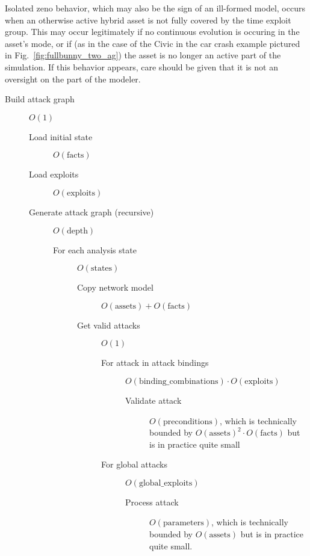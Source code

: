 Isolated zeno behavior, which may also be the sign of an ill-formed model, 
occurs when an otherwise active hybrid asset is not fully covered by the time
exploit group. This may occur legitimately if no continuous evolution is
occuring in the asset's mode, or if (as in the case of the Civic in the
car crash example pictured in Fig.~\ref{fig:fullbunny_two_ag}) the asset is
no longer an active part of the simulation. If this behavior appears, care 
should be given that it is not an oversight on the part of the modeler.
\begin{description}
    \item[Build attack graph] $O(1)$
    \begin{description}
        \item[Load initial state] $O(\text{facts})$
        \item[Load exploits] $O(\text{exploits})$
        \item[Generate attack graph (recursive)] $O(\text{depth})$
        \begin{description}
            \item[For each analysis state] $O(\text{states})$
            \begin{description}
                \item[Copy network model] $O(\text{assets}) + O(\text{facts})$
                \item[Get valid attacks] $O(1)$
                \begin{description}
                    \item[For attack in attack bindings] $O(\text{binding\_combinations}) \cdot O(\text{exploits})$
                    \begin{description}
                        \item[Validate attack] $O(\text{preconditions})$, which is
                            technically bounded by $O(\text{assets})^2 \cdot O(\text{facts})$
                            but is in practice quite small
                    \end{description}
                    \item[For global attacks] $O(\text{global\_exploits})$
                    \begin{description}
                        \item[Process attack] $O(\text{parameters})$, which is technically
                            bounded by $O(\text{assets})$ but is in practice quite small.

\end{description}
\end{description}
\end{description}
\end{description}
\end{description}
\end{description}
